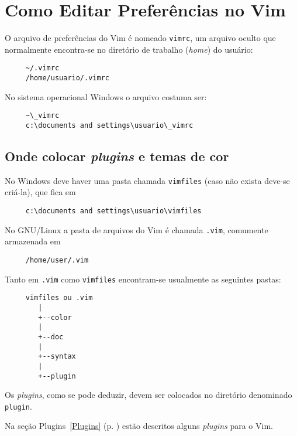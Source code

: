 \chapter{Como Editar Preferências no Vim}\label{cha:Como editar preferências no Vim}

O arquivo de preferências do Vim é nomeado {\tt vimrc}, um arquivo oculto que
normalmente encontra-se no diretório de trabalho ({\em home}) do usuário:

\begin{verbatim}
     ~/.vimrc
     /home/usuario/.vimrc
\end{verbatim}

No sistema operacional Windows o arquivo costuma ser:

\begin{verbatim}
     ~\_vimrc
     c:\documents and settings\usuario\_vimrc
\end{verbatim}

\section{Onde colocar {\em plugins} e temas de cor}
\label{Onde colocar plugins e temas de cor}

No Windows deve haver uma pasta chamada {\tt vimfiles} (caso não exista
deve-se criá-la), que fica em

\begin{verbatim}
     c:\documents and settings\usuario\vimfiles
\end{verbatim}

No GNU/Linux a pasta de arquivos do Vim é chamada {\tt .vim}, comumente
armazenada em

\begin{verbatim}
     /home/user/.vim
\end{verbatim}

Tanto em {\tt .vim} como {\tt vimfiles} encontram-se usualmente as seguintes
pastas:

\begin{verbatim}
     vimfiles ou .vim
        |
        +--color
        |
        +--doc
        |
        +--syntax
        |
        +--plugin
\end{verbatim}

Os {\em plugins}, como se pode deduzir, devem ser colocados no diretório
denominado {\tt plugin}.

Na seção Plugins~\ref{Plugins} (p. \pageref{Plugins}) estão descritos alguns
{\em plugins} para o Vim.

